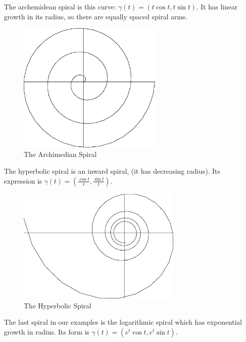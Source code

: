 \documentclass[fleqn]{report}
\begin{document}
\begin{example}
The archemidean spiral is this curve: $\gamma(t) = (t \cos t,
t \sin t)$. It has linear growth in its radius, so there are
equally spaced spiral arms.
\end{example}

\begin{figure}[ht]
\centering
\includegraphics[width=7cm]{figure13.eps}
\caption{The Archimedian Spiral}
\label{figure-parametric-curve4}
\end{figure}

\begin{example}
The hyperbolic spiral is an inward spiral, (it has decreasing
radius). Its expression is $\gamma(t) = (\frac{\cos t}{t},
\frac{\sin t}{t})$. 
\end{example}

\begin{figure}[ht]
\centering
\includegraphics[width=8cm]{figure14.eps}
\caption{The Hyperbolic Spiral}
\label{figure-parametric-curve5}
\end{figure}

\begin{example}
The last spiral in our examples is the logarithmic spiral
which has exponential growth in radius. Its form is
$\gamma(t) = (e^{t} \cos t, e^{t} \sin t)$. 
\end{example}
\end{document}
